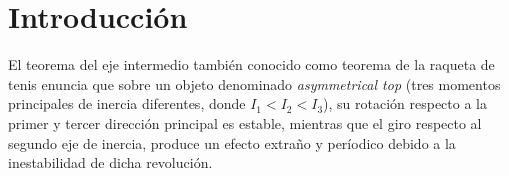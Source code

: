 \documentclass[oneside,a4paper,english,links]{amca}
\begin{document}

\section{Introducción}

El teorema del eje intermedio tambi\'en conocido como teorema de la raqueta de tenis enuncia que sobre un objeto denominado \textit{asymmetrical top} (tres momentos principales de inercia diferentes, donde $I_1<I_2<I_3$), su rotaci\'on respecto a la primer y tercer direcci\'on principal es estable, mientras que el giro respecto al segundo eje de inercia, produce un efecto extra\~no y per\'iodico debido a la inestabilidad de dicha revoluci\'on.

\end{document}
